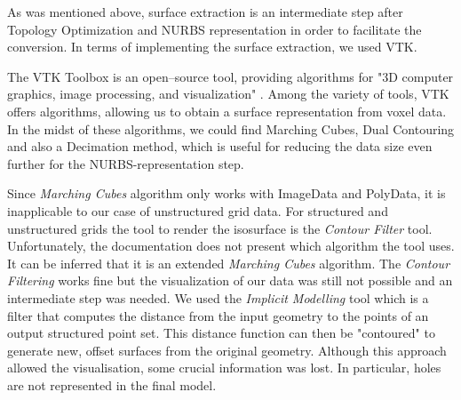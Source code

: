 As was mentioned above, surface extraction is an intermediate step after Topology Optimization and NURBS representation in order to facilitate the conversion. In terms of implementing the surface extraction, we used VTK.




The VTK Toolbox is an open--source tool, providing algorithms for "3D computer graphics, image processing, and visualization" \cite{VTKToolbox}. Among the variety of tools, VTK offers algorithms, allowing us to obtain a surface representation from voxel data. In the midst of these algorithms, we could find Marching Cubes, Dual Contouring and also a Decimation method, which is useful for reducing the data size even further for the NURBS-representation step.


Since \textit{Marching Cubes} algorithm only works with ImageData and PolyData, it is inapplicable to our case of unstructured grid data. For structured and unstructured grids the tool to render the isosurface is the \textit{Contour Filter} tool. Unfortunately, the documentation does not present which algorithm the tool uses. It can be inferred that it is an extended \textit{Marching Cubes} algorithm.
The \textit{Contour Filtering} works fine but the visualization of our data was still not possible
and an intermediate step was needed. We used the \textit{Implicit Modelling} tool which is a filter that
computes the distance from the input geometry to the points of an output structured point set.
This distance function can then be "contoured" to generate new, offset surfaces from the original
geometry. Although this approach allowed the visualisation, some crucial information was lost. In particular, holes are not represented in the final model.  

